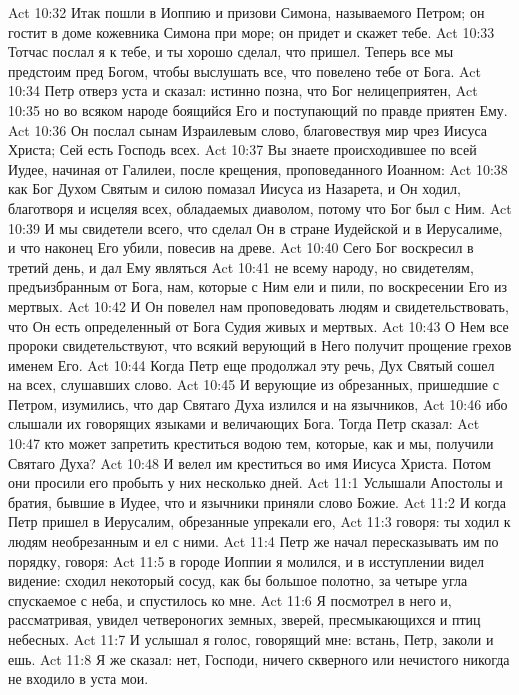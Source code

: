 \vs Act 10:32 Итак пошли в Иоппию и призови Симона, называемого Петром; он гостит в доме кожевника Симона при море; он придет и скажет тебе.
\vs Act 10:33 Тотчас послал я к тебе, и ты хорошо сделал, что пришел. Теперь все мы предстоим пред Богом, чтобы выслушать все, что повелено тебе от Бога.
\rsbpar\vs Act 10:34 Петр отверз уста и сказал: истинно позна, что Бог нелицеприятен,
\vs Act 10:35 но во всяком народе боящийся Его и поступающий по правде приятен Ему.
\vs Act 10:36 Он послал сынам Израилевым слово, благовествуя мир чрез Иисуса Христа; Сей есть Господь всех.
\vs Act 10:37 Вы знаете происходившее по всей Иудее, начиная от Галилеи, после крещения, проповеданного Иоанном:
\vs Act 10:38 как Бог Духом Святым и силою помазал Иисуса из Назарета, и Он ходил, благотворя и исцеляя всех, обладаемых диаволом, потому что Бог был с Ним.
\vs Act 10:39 И мы свидетели всего, что сделал Он в стране Иудейской и в Иерусалиме, и что наконец Его убили, повесив на древе.
\vs Act 10:40 Сего Бог воскресил в третий день, и дал Ему являться
\vs Act 10:41 не всему народу, но свидетелям, предъизбранным от Бога, нам, которые с Ним ели и пили, по воскресении Его из мертвых.
\vs Act 10:42 И Он повелел нам проповедовать людям и свидетельствовать, что Он есть определенный от Бога Судия живых и мертвых.
\vs Act 10:43 О Нем все пророки свидетельствуют, что всякий верующий в Него получит прощение грехов именем Его.
\rsbpar\vs Act 10:44 Когда Петр еще продолжал эту речь, Дух Святый сошел на всех, слушавших слово.
\vs Act 10:45 И верующие из обрезанных, пришедшие с Петром, изумились, что дар Святаго Духа излился и на язычников,
\vs Act 10:46 ибо слышали их говорящих языками и величающих Бога. Тогда Петр сказал:
\vs Act 10:47 кто может запретить креститься водою тем, которые, как и мы, получили Святаго Духа?
\vs Act 10:48 И велел им креститься во имя Иисуса Христа. Потом они просили его пробыть у них несколько дней.
\vs Act 11:1 Услышали Апостолы и братия, бывшие в Иудее, что и язычники приняли слово Божие.
\vs Act 11:2 И когда Петр пришел в Иерусалим, обрезанные упрекали его,
\vs Act 11:3 говоря: ты ходил к людям необрезанным и ел с ними.
\vs Act 11:4 Петр же начал пересказывать им по порядку, говоря:
\vs Act 11:5 в городе Иоппии я молился, и в исступлении видел видение: сходил некоторый сосуд, как бы большое полотно, за четыре угла спускаемое с неба, и спустилось ко мне.
\vs Act 11:6 Я посмотрел в него и, рассматривая, увидел четвероногих земных, зверей, пресмыкающихся и птиц небесных.
\vs Act 11:7 И услышал я голос, говорящий мне: встань, Петр, заколи и ешь.
\vs Act 11:8 Я же сказал: нет, Господи, ничего скверного или нечистого никогда не входило в уста мои.
